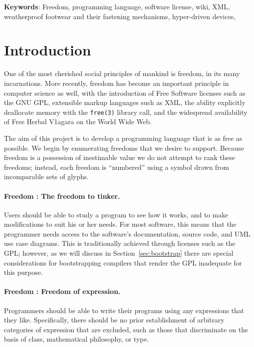 \documentclass[twocolumn]{article}
\begin{document}
\vspace{1em}
{\noindent \small {\bf Keywords}:
  Freedom, programming language, software license, wiki, XML, 
  weatherproof footwear and their fastening mechanisms,
  hyper-driven devices,
}

\section{Introduction}

One of the most cherished social principles of mankind is
freedom,\z{} in its many incarnations. More recently,
freedom has become an important principle in computer science as well,
with the introduction of Free Software licenses such as the GNU
GPL,\z{} extensible markup languages
such as XML,\z{} the ability explicitly deallocate memory
with the {\tt free(3)} library call, and the widespread availability of
Free Herbal V1agara on the World Wide Web.\z{}

The aim of this project is to develop a programming language that is
as free as possible. We begin by enumerating freedoms that we desire
to support. Because freedom is a possession of inestimable
value we do not attempt to rank these freedoms; instead,
each freedom is ``numbered'' using a symbol drawn from incomparable
sets of glyphs.

\paragraph{Freedom \ftinker: The freedom to tinker.}
Users should be able to study a program to see how it works, and to
make modifications to suit his or her needs. For most software, this
means that the programmer needs access to the software's
documentation, source code, and UML
use case diagrams. This is traditionally achieved through licenses
such as the GPL; however, as we will discuss in
Section~\ref{sec:bootstrap} there are special considerations for
bootstrapping compilers that render the GPL inadequate for this
purpose.

\paragraph{Freedom \fexpression: Freedom of expression.}
Programmers should be able to write their programs using any
expressions that they like. Specifically, there should be no
prior establishment of arbitrary categories of expression that
are excluded, such as those that discriminate on the basis
of class, mathematical philosophy, or type.
\end{document}
